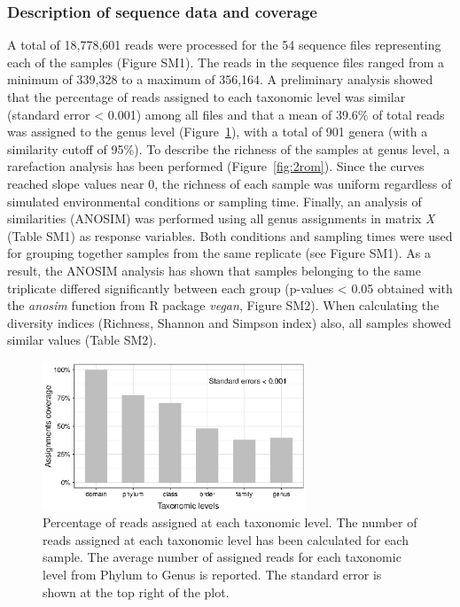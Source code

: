 \subsubsection{Description of sequence data and coverage}
A total of 18,778,601 reads were processed for the 54 sequence files representing each of the samples (Figure SM1). The reads in the sequence files ranged from a minimum of 339,328 to a maximum of 356,164. A preliminary analysis showed that the percentage of reads assigned to each taxonomic level was similar (standard error {\textless} 0.001) among all files and that a mean of 39.6\% of total reads was assigned to the genus level (Figure~\ref{fig:1rom}), with a total of 901 genera (with a similarity cutoff of 95\%). To describe the richness of the samples at genus level, a rarefaction analysis has been performed (Figure~\ref{fig:2rom}). Since the curves reached slope values near 0,  the richness of each sample was uniform regardless of simulated environmental conditions or sampling time. Finally, an analysis of similarities (ANOSIM) was performed using all genus assignments in matrix \textit{X} (Table SM1) as response variables. Both conditions and sampling times were used for grouping together samples from the same replicate (see Figure SM1). As a result, the ANOSIM analysis has shown that samples belonging to the same triplicate differed significantly between each group (p-values {\textless} 0.05 obtained with the \textit{anosim} function from R package \textit{vegan}, Figure SM2). When calculating the diversity indices (Richness, Shannon and Simpson index) also, all samples showed similar values (Table SM2).\\
\begin{figure}[!tb]
	\centering
	\includegraphics[width=0.7\textwidth]{./figures/Chapter_3/Fig1.eps}
  	\caption{Percentage of reads assigned at each taxonomic level. The number of reads assigned at each taxonomic level has been calculated for each sample. The average number of assigned reads for each taxonomic level from Phylum to Genus is reported. The standard error is shown at the top right of the plot. \label{fig:1rom}}
\end{figure}

